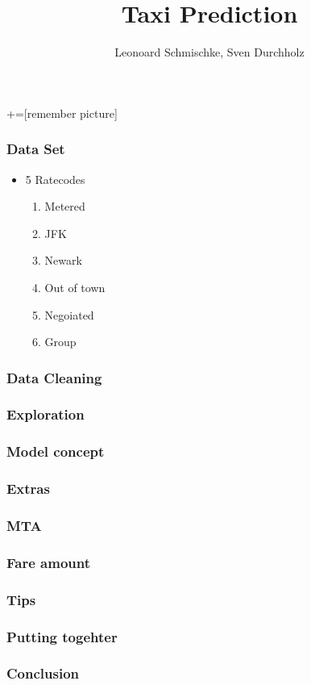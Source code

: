 \documentclass{beamer} %
\author{Leonoard Schmischke, Sven Durchholz}
\title{Taxi Prediction}
\begin{document}
\frame{\titlepage}


\begin{comment}
:Title: Beamer arrows
:Tags: Remember picture, Beamer, Physics & chemistry, Overlays
:Use page: 3

With PGF/TikZ version 1.09 and later, it is possible to draw paths between nodes across
different pictures. This is a useful feature for presentations with the
Beamer package. In this example I've combined the new PGF/TikZ's overlay feature
with Beamer overlays. Download the PDF version to see the result.

**Note.** This only works with PDFTeX, and you have to run PDFTeX twice.

| Author: Kjell Magne Fauske

\end{comment}


+=[remember picture]

\everymath{\displaystyle}

\begin{frame}
\frametitle{Data Set}
\begin{itemize}
	\item 5 Ratecodes
	\begin{enumerate}
		\item Metered
		\item JFK
		\item Newark
		\item Out of town
		\item Negoiated
		\item Group
	\end{enumerate}
\end{itemize}
\end{frame}

\begin{frame}
\frametitle{Data Cleaning}
\end{frame}

\begin{frame}
\frametitle{Exploration}
\end{frame}

\begin{frame}
\frametitle{Model concept}
\end{frame}

\begin{frame}
\frametitle{Extras}
\end{frame}

\begin{frame}
\frametitle{MTA}
\end{frame}

\begin{frame}
\frametitle{Fare amount}
\end{frame}

\begin{frame}
\frametitle{Tips}
\end{frame}

\begin{frame}
\frametitle{Putting togehter}
\end{frame}

\begin{frame}
\frametitle{Conclusion}
\end{frame}
\end{document}
